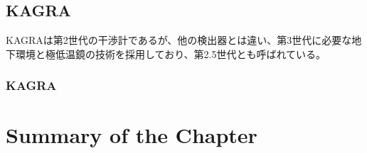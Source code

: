 


\subsection{KAGRA}
KAGRAは第2世代の干渉計であるが、他の検出器とは違い、第3世代に必要な地下環境と極低温鏡の技術を採用しており、第2.5世代とも呼ばれている。

\subsubsection{KAGRA}



\section{Summary of the Chapter}
